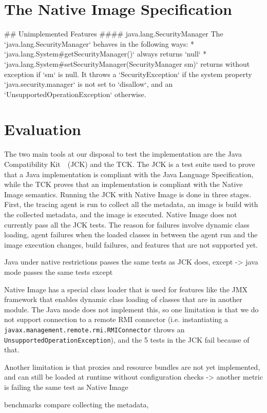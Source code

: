 \chapter{The Native Image Specification}\label{native_image_specs}


## Unimplemented Features
#### java.lang.SecurityManager
The `java.lang.SecurityManager` behaves in the following ways:
* `java.lang.System#getSecurityManager()` always returns `null`
* `java.lang.System#setSecurityManager(SecurityManager sm)` returns without exception if `sm` is null. 
It throws a `SecurityException` if the system property `java.security.manager` is not set to `disallow`, and an 
`UnsupportedOperationException` otherwise.


\chapter{Evaluation}
The two main tools at our disposal to test the implementation are the Java Compatibility Kit~\cite{noauthor_gaining_nodate}~(JCK) and the TCK.
The JCK is a test suite used to prove that a Java implementation is compliant with the Java Language Specification, while the TCK proves that an implementation is compliant with
the Native Image semantics.
Running the JCK with Native Image is done in three stages. First, the tracing agent is run to collect all the metadata, an image is build with the collected metadata, and the image is executed. 
Native Image does not currently pass all the JCK tests. The reason for failures involve dynamic class loading, agent failures when the loaded classes in between the agent run and the image execution changes, build failures, and features that are not supported yet.

Java under native restrictions passes the same tests as JCK does, except  
-> java mode passes the same tests except

Native Image has a special class loader that is used for features like the JMX framework that enables dynamic class loading of classes that are in another module. The Java mode does not implement this, so one limitation is that we do not support connection to a remote RMI connector (i.e. instantiating a \verb|javax.management.remote.rmi.RMIConnector| throws an \verb|UnsupportedOperationException|), and the 5 tests in the JCK fail because of that.

Another limitation is that proxies and resource bundles are not yet implemented, and can still be loaded at runtime without configuration checks
-> another metric is failing the same test as Native Image

benchmarks compare collecting the metadata, 
